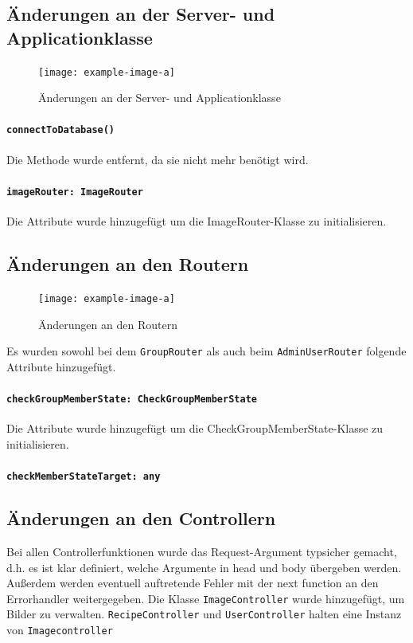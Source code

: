 \documentclass{implementierungsheft}
\begin{document}
\subsection{Änderungen an der Server- und Applicationklasse}

\begin{figure}[htp]
    \centering
    \texttt{[image: example-image-a]}
    \caption{Änderungen an der Server- und Applicationklasse}
    \label{fig:server}
\end{figure}
\paragraph{\texttt{connectToDatabase()}} Die Methode wurde entfernt, da sie nicht mehr benötigt wird.

\paragraph{\texttt{imageRouter: ImageRouter}} Die Attribute wurde hinzugefügt um die ImageRouter-Klasse zu initialisieren.

\subsection{Änderungen an den Routern}
\begin{figure}[htp]
    \centering
    \texttt{[image: example-image-a]}
    \caption{Änderungen an den Routern}
    \label{fig:routers}
\end{figure}

Es wurden sowohl bei dem \texttt{GroupRouter} als auch beim \texttt{AdminUserRouter} folgende Attribute hinzugefügt.

\paragraph{\texttt{checkGroupMemberState: CheckGroupMemberState}} Die Attribute wurde hinzugefügt um die CheckGroupMemberState-Klasse zu initialisieren.
\paragraph{\texttt{checkMemberStateTarget: any}} 

\subsection{Änderungen an den Controllern}

Bei allen Controllerfunktionen wurde das Request-Argument typsicher gemacht, d.h. es ist klar definiert, welche Argumente in head und body übergeben werden. 
Außerdem werden eventuell auftretende Fehler mit der next function an den Errorhandler weitergegeben. Die Klasse \texttt{ImageController} wurde hinzugefügt, um Bilder zu verwalten. 
\texttt{RecipeController} und \texttt{UserController} halten eine Instanz von \texttt{Imagecontroller}
\end{document}

